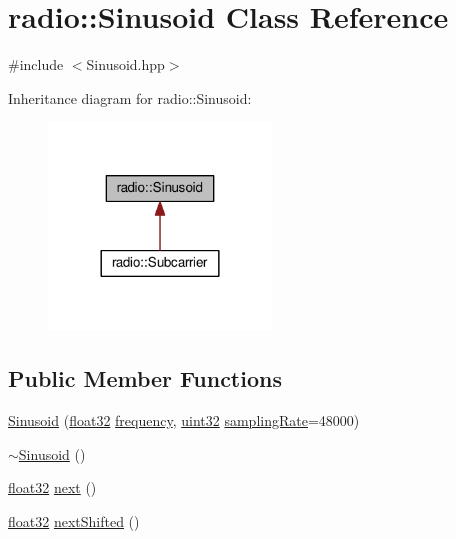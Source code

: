 \hypertarget{classradio_1_1Sinusoid}{\section{radio\+:\+:Sinusoid Class Reference}
\label{classradio_1_1Sinusoid}
}


{\ttfamily \#include $<$Sinusoid.\+hpp$>$}



Inheritance diagram for radio\+:\+:Sinusoid\+:
\nopagebreak
\begin{figure}[H]
\begin{center}
\leavevmode
\includegraphics[width=168pt]{classradio_1_1Sinusoid__inherit__graph}
\end{center}
\end{figure}
\subsection*{Public Member Functions}
\begin{DoxyCompactItemize}
\item 
\hyperlink{classradio_1_1Sinusoid_a9494c3cb2bca12effdf770e10dfbe8a5}{Sinusoid} (\hyperlink{definitions_8hpp_aacdc525d6f7bddb3ae95d5c311bd06a1}{float32} \hyperlink{classradio_1_1Sinusoid_ad429b5dd330e96aaf89a0d48ef59d3f2}{frequency}, \hyperlink{definitions_8hpp_a1134b580f8da4de94ca6b1de4d37975e}{uint32} \hyperlink{classradio_1_1Sinusoid_a964d64aae9acc4ea5d752534a33d76b8}{sampling\+Rate}=48000)
\item 
\hyperlink{classradio_1_1Sinusoid_ad9e8edf233f8146891a14f20d1c903d2}{$\sim$\+Sinusoid} ()
\item 
\hyperlink{definitions_8hpp_aacdc525d6f7bddb3ae95d5c311bd06a1}{float32} \hyperlink{classradio_1_1Sinusoid_aab44298ea1bd5cb175d5826243cf56f2}{next} ()
\item 
\hyperlink{definitions_8hpp_aacdc525d6f7bddb3ae95d5c311bd06a1}{float32} \hyperlink{classradio_1_1Sinusoid_a3f2741e9dd30291e5fa87f2eb2243e7c}{next\+Shifted} ()
\end{DoxyCompactItemize}
